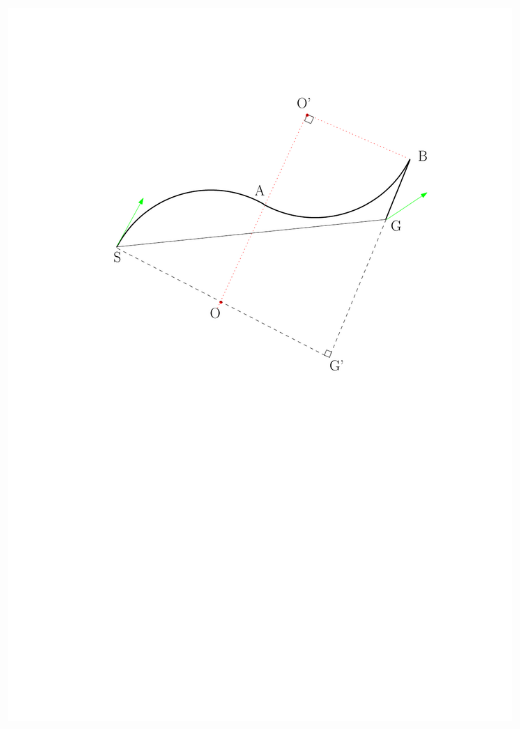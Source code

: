 \documentclass[12pt]{article}
\begin{document}
  \hspace*{2cm}\includegraphics[scale=0.8]{Path_general_case}\\
\end{document}

